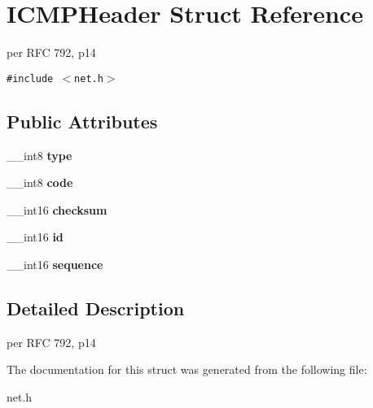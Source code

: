 \hypertarget{structICMPHeader}{
\section{ICMPHeader Struct Reference}
\label{structICMPHeader}
}
per RFC 792, p14  


{\tt \#include $<$net.h$>$}

\subsection*{Public Attributes}
\begin{CompactItemize}
\item 
\hypertarget{structICMPHeader_c81f0d7bf94af75076479b1dc65426b8}{
\_\-\_\-int8 \textbf{type}}
\label{structICMPHeader_c81f0d7bf94af75076479b1dc65426b8}

\item 
\hypertarget{structICMPHeader_5980185da8b1942510e0209be4e73619}{
\_\-\_\-int8 \textbf{code}}
\label{structICMPHeader_5980185da8b1942510e0209be4e73619}

\item 
\hypertarget{structICMPHeader_2293c561e037d15654e0f70aa9832b1d}{
\_\-\_\-int16 \textbf{checksum}}
\label{structICMPHeader_2293c561e037d15654e0f70aa9832b1d}

\item 
\hypertarget{structICMPHeader_6ce2288c23a951f8183a684fb417c0a4}{
\_\-\_\-int16 \textbf{id}}
\label{structICMPHeader_6ce2288c23a951f8183a684fb417c0a4}

\item 
\hypertarget{structICMPHeader_5e4d171da8c420294cbec9a98842038f}{
\_\-\_\-int16 \textbf{sequence}}
\label{structICMPHeader_5e4d171da8c420294cbec9a98842038f}

\end{CompactItemize}


\subsection{Detailed Description}
per RFC 792, p14 

The documentation for this struct was generated from the following file:\begin{CompactItemize}
\item 
net.h\end{CompactItemize}

